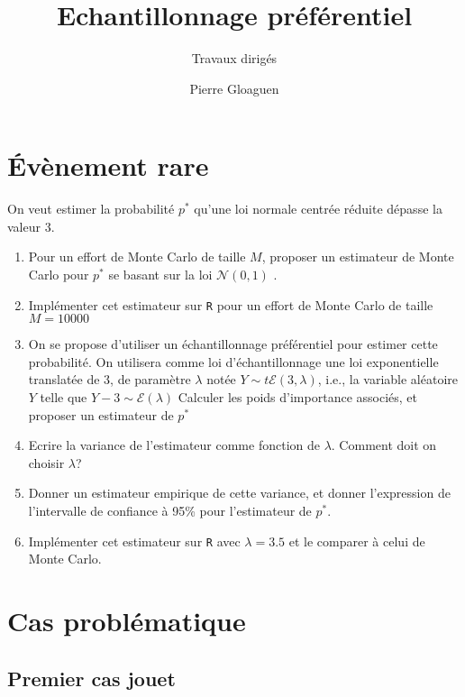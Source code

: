 \documentclass[]{article}
\title{Echantillonnage préférentiel}
\subtitle{Travaux dirigés}
\author{Pierre Gloaguen}
\date{}
\begin{document}
\maketitle

{
\setcounter{tocdepth}{3}
\tableofcontents
}
\hypertarget{uxe9vuxe8nement-rare}{%
\section{Évènement rare}\label{uxe9vuxe8nement-rare}}

On veut estimer la probabilité \(p^*\) qu'une loi normale centrée
réduite dépasse la valeur 3.

\begin{enumerate}
\def\labelenumi{\arabic{enumi}.}
\item
  Pour un effort de Monte Carlo de taille \(M\), proposer un estimateur
  de Monte Carlo pour \(p^*\) se basant sur la loi \(\mathcal{N}(0, 1)\)
  .
\item
  Implémenter cet estimateur sur \texttt{R} pour un effort de Monte
  Carlo de taille \(M= 10000\)
\item
  On se propose d'utiliser un échantillonnage préférentiel pour estimer
  cette probabilité. On utilisera comme loi d'échantillonnage une loi
  exponentielle translatée de 3, de paramètre \(\lambda\) notée
  \(Y\sim t\mathcal{E}(3, \lambda)\), i.e., la variable aléatoire \(Y\)
  telle que \(Y - 3 \sim \mathcal{E}(\lambda)\) Calculer les poids
  d'importance associés, et proposer un estimateur de \(p^*\)
\item
  Ecrire la variance de l'estimateur comme fonction de \(\lambda\).
  Comment doit on choisir \(\lambda\)?
\item
  Donner un estimateur empirique de cette variance, et donner
  l'expression de l'intervalle de confiance à 95\% pour l'estimateur de
  \(p^*\).
\item
  Implémenter cet estimateur sur \texttt{R} avec \(\lambda = 3.5\) et le
  comparer à celui de Monte Carlo.
\end{enumerate}

\hypertarget{cas-probluxe9matique}{%
\section{Cas problématique}\label{cas-probluxe9matique}}

\hypertarget{premier-cas-jouet}{%
\subsection{Premier cas jouet}\label{premier-cas-jouet}}
\end{document}
